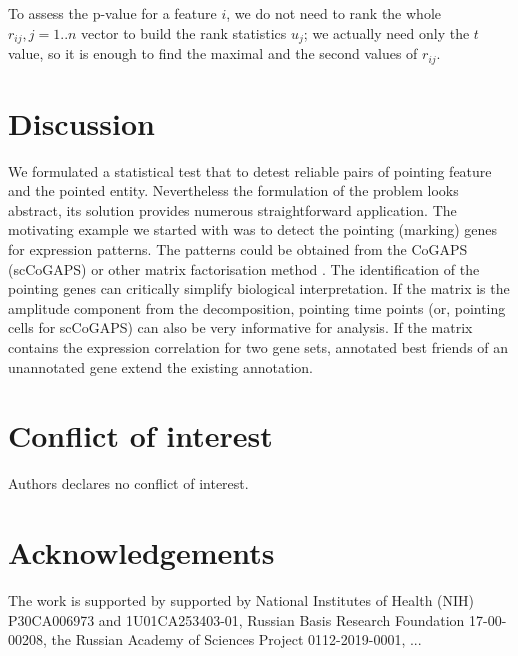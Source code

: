 \documentclass{llncs}
\begin{document}
To assess the p-value for a feature $i$, we do not need to rank the whole $r_{ij}, j=1..n$ vector to build the rank statistics $u_j$; we actually need only the $t$ value, so it is enough to find the maximal and the second values of $r_{ij}$.

\section{Discussion}

We formulated a statistical test that to detest reliable pairs of pointing feature and the pointed entity. Nevertheless the formulation of the problem looks abstract, its solution provides numerous straightforward application. The motivating example we started with was to detect the pointing (marking) genes for expression patterns. The patterns could be obtained from the CoGAPS (scCoGAPS) \cite{Fertig_2016} or other matrix factorisation method \cite{Stein_2018}. The identification of the pointing genes can critically simplify biological interpretation. If the matrix is the amplitude component from  the decomposition, pointing time points (or, pointing cells for scCoGAPS) can also be very informative for analysis. If the matrix contains the expression correlation for two gene sets, annotated best friends of an unannotated gene extend the existing annotation.

\section{Conflict of interest}
Authors declares no conflict of interest.

\section{Acknowledgements}
The work is supported by supported by National Institutes of Health (NIH) P30CA006973 and 1U01CA253403-01, Russian Basis Research Foundation 17-00-00208, the Russian Academy of Sciences Project 0112-2019-0001, ...




\end{document}
